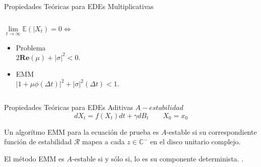 \begin{frame}{Propiedades Te\'oricas para EDEs Multiplicativas}
  \begin{columns}
  \begin{block}{$\lim\limits_{t\to\infty}\mathbb{E}(|X_t)=0\Leftrightarrow$}
    \begin{itemize}
      \item Problema \\
      $
            2\mathbf{Re}(\mu)+|\sigma|^2<0.
      $
      \item EMM\\
      $
          |1+\mu\phi(\Delta t)|^2 + |\sigma|^2 (\Delta t)<1.
        $
    \end{itemize}
  \end{block}
     \end{columns}
\end{frame}
\begin{bibunit}[aalpha]
\begin{frame}{Propiedades Te\'oricas para EDEs Aditivas $A-estabilidad$}
  \begin{equation*}
      dX_t=f(X_t)dt+\gamma dB_t \qquad X_0=x_0
    \end{equation*}
\begin{Definicion}
    Un algor\'itmo EMM para la ecuaci\'on de prueba es $A$-estable si su
    correspondiente funci\'on de estabilidad  $\mathcal{R}$  mapea a cada  $z\in\mathbb{C}^-$ en el disco
unitario
    complejo.
\end{Definicion}
\begin{Teorema}
    El m\'etodo EMM es $A$-estable si y s\'olo si, lo es su componente determinista.
  \cite{hernandez1992stability}.
\end{Teorema}
\end{frame}
\end{bibunit}
